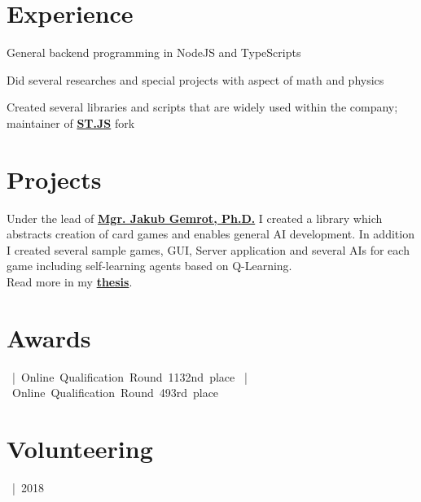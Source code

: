 \documentclass[]{resume}
\begin{document}
\hfill
\begin{minipage}[t]{0.66\textwidth} 


\section{Experience}
\vspace{\topsep} %
\begin{tightemize}
\item General backend programming in NodeJS and TypeScripts
\item Did several researches and special projects with aspect of math and physics
\item Created several libraries and scripts that are widely used within the company; maintainer of \textbf{\href{https://github.com/JakubMifek/SelectTransform}{ST.JS}} fork
\end{tightemize}
\sectionsep


\section{Projects}
Under the lead of \textbf{\href{https://gamedev.cuni.cz/contacts/}{Mgr. Jakub Gemrot, Ph.D.}} I created a library which abstracts creation of card games and enables general AI development. In addition I created several sample games, GUI, Server application and several AIs for each game including self-learning agents based on Q-Learning. \\
Read more in my \textbf{\href{https://dspace.cuni.cz/bitstream/handle/20.500.11956/101143/130239537.pdf?sequence=1&isAllowed=y}{thesis}}.
\sectionsep


\section{Awards}
\mbox{ | Online Qualification Round \textbullet{} 1132nd place}
\mbox{ | Online Qualification Round \textbullet{} 493rd place}
\sectionsep


\section{Volunteering}
\mbox{ | 2018} \\
\sectionsep

\end{minipage} 
\end{document}

